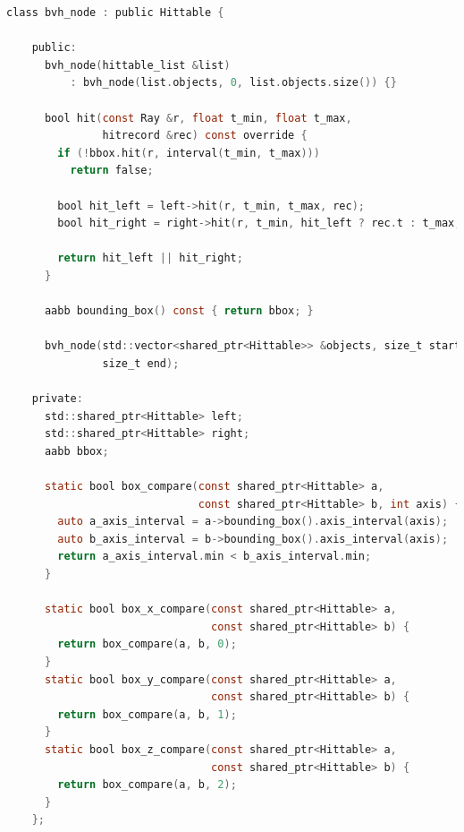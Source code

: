\documentclass[../main.tex]{subfiles}
\begin{document}
\begin{lstlisting}[language=C, caption="BVH Node Structure", breaklines=true]
    class bvh_node : public Hittable {

    public:
      bvh_node(hittable_list &list)
          : bvh_node(list.objects, 0, list.objects.size()) {}
    
      bool hit(const Ray &r, float t_min, float t_max,
               hitrecord &rec) const override {
        if (!bbox.hit(r, interval(t_min, t_max)))
          return false;
    
        bool hit_left = left->hit(r, t_min, t_max, rec);
        bool hit_right = right->hit(r, t_min, hit_left ? rec.t : t_max, rec);
    
        return hit_left || hit_right;
      }
    
      aabb bounding_box() const { return bbox; }
    
      bvh_node(std::vector<shared_ptr<Hittable>> &objects, size_t start,
               size_t end);
    
    private:
      std::shared_ptr<Hittable> left;
      std::shared_ptr<Hittable> right;
      aabb bbox;
    
      static bool box_compare(const shared_ptr<Hittable> a,
                              const shared_ptr<Hittable> b, int axis) {
        auto a_axis_interval = a->bounding_box().axis_interval(axis);
        auto b_axis_interval = b->bounding_box().axis_interval(axis);
        return a_axis_interval.min < b_axis_interval.min;
      }
    
      static bool box_x_compare(const shared_ptr<Hittable> a,
                                const shared_ptr<Hittable> b) {
        return box_compare(a, b, 0);
      }
      static bool box_y_compare(const shared_ptr<Hittable> a,
                                const shared_ptr<Hittable> b) {
        return box_compare(a, b, 1);
      }
      static bool box_z_compare(const shared_ptr<Hittable> a,
                                const shared_ptr<Hittable> b) {
        return box_compare(a, b, 2);
      }
    };
    
    
\end{lstlisting}
\end{document}
